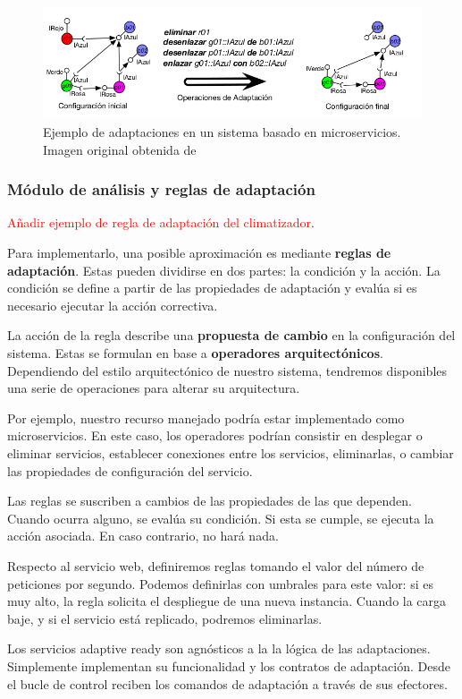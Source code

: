 \begin{figure}[htb]
  \centering
  \includegraphics[scale=1.8]{cap_sistema_original/images/adaptaciones}
  \caption[Ejemplo de adaptaciones en un sistema basado en microservicios.]{Ejemplo de adaptaciones en un sistema basado en microservicios. Imagen original obtenida de \cite{fonsServiciosAdaptivereadyPara2021}}
  \label{fig:adaptaciones-microservicios}
\end{figure}


\subsubsection{Módulo de análisis y reglas de adaptación}

\textcolor{red}{Añadir ejemplo de regla de adaptación del climatizador}.

Para implementarlo, una posible aproximación es mediante \textbf{reglas de adaptación}. Estas pueden dividirse en dos partes: la condición y la acción. La condición se define a partir de las propiedades de adaptación y evalúa si es necesario ejecutar la acción correctiva.

La acción de la regla describe una \textbf{propuesta de cambio} en la configuración del sistema. Estas se formulan en base a \textbf{operadores arquitectónicos}. \cite{garlanIncreasingSystemDependability2003} Dependiendo del estilo arquitectónico de nuestro sistema, tendremos disponibles una serie de operaciones para alterar su arquitectura.

Por ejemplo, nuestro recurso manejado podría estar implementado como microservicios. En este caso, los operadores podrían consistir en desplegar o eliminar servicios, establecer conexiones entre los servicios, eliminarlas, o cambiar las propiedades de configuración del servicio. \cite{fonsServiciosAdaptivereadyPara2021}

Las reglas se suscriben a cambios de las propiedades de las que dependen. Cuando ocurra alguno, se evalúa su condición. Si esta se cumple, se ejecuta la acción asociada. En caso contrario, no hará nada.

Respecto al servicio web, definiremos reglas tomando el valor del número de peticiones por segundo. Podemos definirlas con umbrales para este valor: si es muy alto, la regla solicita el despliegue de una nueva instancia. Cuando la carga baje, y si el servicio está replicado, podremos eliminarlas.


Los servicios adaptive ready son agnósticos a la la lógica de las adaptaciones. Simplemente implementan su funcionalidad y los contratos de adaptación. Desde el bucle de control reciben los comandos de adaptación a través de sus efectores.
